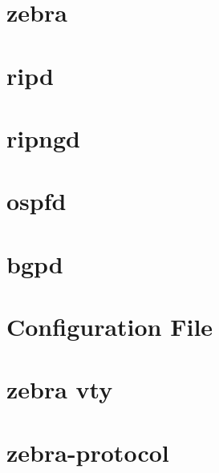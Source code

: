 \documentclass[10pt,titlepage]{jarticle}
\begin{document}
%
\section{zebra}

%
\section{ripd}

%
\section{ripngd}

%
\section{ospfd}

%
\section{bgpd}

%
\section{Configuration File}

%
\section{zebra vty}

%
\section{zebra-protocol}
\end{document}
